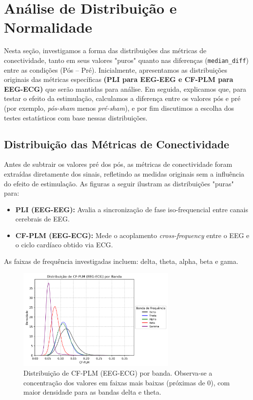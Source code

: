 \chapter{Análise de Distribuição e Normalidade}
\label{chap:analise_distribuicao_normalidade}

Nesta seção, investigamos a forma das distribuições das métricas de conectividade, tanto em seus valores "puros" quanto nas diferenças (\texttt{median\_diff}) entre as condições (Pós – Pré). Inicialmente, apresentamos as distribuições originais das métricas específicas \textbf{(PLI para EEG-EEG e CF-PLM para EEG-ECG)} que serão mantidas para análise. Em seguida, explicamos que, para testar o efeito da estimulação, calculamos a diferença entre os valores pós e pré (por exemplo, \emph{pós-sham} menos \emph{pré-sham}), e por fim discutimos a escolha dos testes estatísticos com base nessas distribuições.

\section{Distribuição das Métricas de Conectividade}

Antes de subtrair os valores pré dos pós, as métricas de conectividade foram extraídas diretamente dos sinais, refletindo as medidas originais sem a influência do efeito de estimulação. As figuras a seguir ilustram as distribuições "puras" para:

\begin{itemize}
    \item \textbf{PLI (EEG-EEG):} Avalia a sincronização de fase iso-frequencial entre canais cerebrais de EEG.
    \item \textbf{CF-PLM (EEG-ECG):} Mede o acoplamento \emph{cross-frequency} entre o EEG e o ciclo cardíaco obtido via ECG.
\end{itemize}

As faixas de frequência investigadas incluem: delta, theta, alpha, beta e gama.

\begin{figure}[htb]
    \centering
    \includegraphics[width=0.7\textwidth]{figs/3_1_connectivity_metrics/Distribuição_de_CF-PLM_(EEG-ECG)_por_Banda.png}
    \caption{Distribuição de CF-PLM (EEG-ECG) por banda. Observa-se a concentração dos valores em faixas mais baixas (próximas de 0), com maior densidade para as bandas delta e theta.}
    \label{fig:cfplm_eeg_ecg}
\end{figure}

